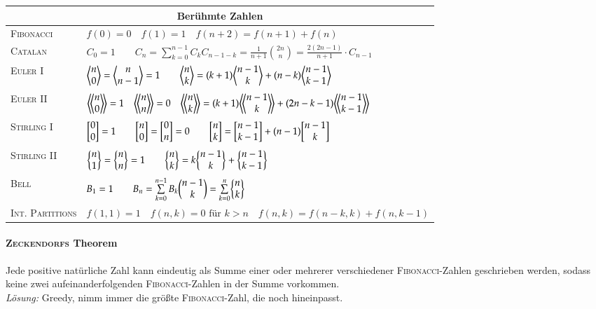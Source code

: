 \begin{tabular}{ll}
	\toprule
	\multicolumn{2}{c}{Berühmte Zahlen} \\
	\midrule 
	\textsc{Fibonacci}	&
	$f(0) = 0 \quad
	f(1) = 1 \quad
	f(n+2) = f(n+1) + f(n)$ \\

	\textsc{Catalan}	&
	$C_0 = 1 \qquad
	C_n = \sum\limits_{k = 0}^{n - 1} C_kC_{n - 1 - k} =
	\frac{1}{n + 1}\binom{2n}{n} = \frac{2(2n - 1)}{n+1} \cdot C_{n-1}$ \\

	\textsc{Euler} I &
	$\biggl\langle \begin{matrix} n \\ 0 \end{matrix} \biggr\rangle = \biggl\langle \begin{matrix} n \\ n-1 \end{matrix} \biggr\rangle = 1 \qquad
	\biggl\langle \begin{matrix} n \\ k \end{matrix} \biggr\rangle = (k+1) \biggl\langle \begin{matrix} n-1 \\ k \end{matrix} \biggr\rangle + (n-k) \biggl\langle \begin{matrix} n-1 \\ k-1 \end{matrix} \biggr\rangle $ \\

	\textsc{Euler} II &
	$\eulerII{n}{0} = 1 \quad
	\eulerII{n}{n} = 0 \quad
	\eulerII{n}{k} = (k+1) \eulerII{n-1}{k} + (2n-k-1) \eulerII{n-1}{k-1}$ \\

	\textsc{Stirling} I &
	$\biggl[ \begin{matrix} 0 \\ 0 \end{matrix} \biggr] = 1 \qquad
	\biggl[ \begin{matrix} n \\ 0 \end{matrix} \biggr] = \biggl[ \begin{matrix} 0 \\ n \end{matrix} \biggr] = 0 \qquad
	\biggl[ \begin{matrix} n \\ k \end{matrix} \biggr] = \biggl[ \begin{matrix} n-1 \\ k-1 \end{matrix} \biggr] + (n-1) \biggl[ \begin{matrix} n-1 \\ k \end{matrix} \biggr]$ \\

	\textsc{Stirling} II &
	$\biggl\{ \begin{matrix} n \\ 1 \end{matrix} \biggr\} = \biggl\{ \begin{matrix} n \\ n \end{matrix} \biggr\} = 1 \qquad
	\biggl\{ \begin{matrix} n \\ k \end{matrix} \biggr\} = k \biggl\{ \begin{matrix} n-1 \\ k \end{matrix} \biggr\} + \biggl\{ \begin{matrix} n-1 \\ k-1 \end{matrix} \biggr\}$ \\

	\textsc{Bell} &
	$B_1 = 1 \qquad
	B_n = \sum\limits_{k = 0}^{n - 1} B_k\biggl( \begin{matrix} n-1 \\ k \end{matrix} \biggr)
	= \sum\limits_{k = 0}^{n}\biggl\{ \begin{matrix} n \\ k \end{matrix} \biggr\}$\\

	\textsc{Int. Partitions} &
	$f(1,1) = 1 \quad
	f(n,k) = 0 \text{ für } k > n \quad
	f(n,k) = f(n-k,k) + f(n,k-1)$ \\
	\bottomrule
\end{tabular}

\paragraph{\textsc{Zeckendorfs} Theorem}
Jede positive natürliche Zahl kann eindeutig als Summe einer oder mehrerer
verschiedener \textsc{Fibonacci}-Zahlen geschrieben werden, sodass keine zwei
aufeinanderfolgenden \textsc{Fibonacci}-Zahlen in der Summe vorkommen.\\
\emph{Lösung:} Greedy, nimm immer die größte \textsc{Fibonacci}-Zahl, die noch
hineinpasst.

